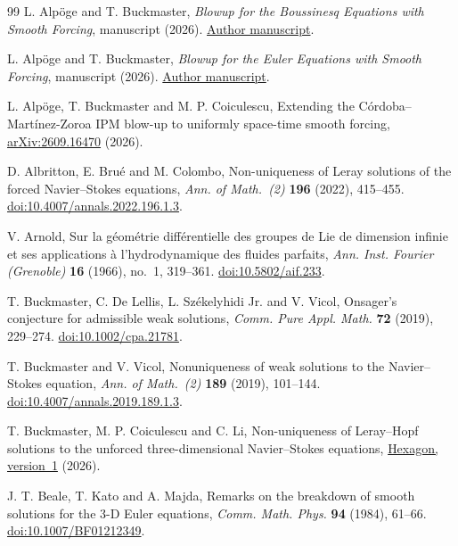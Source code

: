 \begin{thebibliography}{99}
 L. Alp\"oge and T. Buckmaster,
\emph{Blowup for the Boussinesq Equations with Smooth Forcing}, manuscript (2026).
\href{https://cims.nyu.edu/~tristanb/boussinesq.pdf}{Author manuscript}.

 L. Alp\"oge and T. Buckmaster,
\emph{Blowup for the Euler Equations with Smooth Forcing}, manuscript (2026).
\href{https://cims.nyu.edu/~tristanb/euler.pdf}{Author manuscript}.

L. Alp\"oge, T. Buckmaster and M. P. Coiculescu,
Extending the C\'ordoba--Mart\'inez-Zoroa IPM blow-up to uniformly
space-time smooth forcing,
\href{https://arxiv.org/abs/2609.16470}{arXiv:2609.16470} (2026).

 D. Albritton, E. Bru\'e and M. Colombo,
Non-uniqueness of Leray solutions of the forced Navier--Stokes equations,
\emph{Ann. of Math.~(2)} \textbf{196} (2022), 415--455.
\href{https://doi.org/10.4007/annals.2022.196.1.3}{doi:10.4007/annals.2022.196.1.3}.

 V. Arnold,
Sur la g\'eom\'etrie diff\'erentielle des groupes de Lie de dimension
infinie et ses applications \`a l'hydrodynamique des fluides parfaits,
\emph{Ann. Inst. Fourier (Grenoble)} \textbf{16} (1966), no.~1, 319--361.
\href{https://doi.org/10.5802/aif.233}{doi:10.5802/aif.233}.

T. Buckmaster, C. De Lellis, L. Sz\'ekelyhidi Jr. and V. Vicol,
Onsager's conjecture for admissible weak solutions,
\emph{Comm. Pure Appl. Math.} \textbf{72} (2019), 229--274.
\href{https://doi.org/10.1002/cpa.21781}{doi:10.1002/cpa.21781}.

 T. Buckmaster and V. Vicol,
Nonuniqueness of weak solutions to the Navier--Stokes equation,
\emph{Ann. of Math.~(2)} \textbf{189} (2019), 101--144.
\href{https://doi.org/10.4007/annals.2019.189.1.3}{doi:10.4007/annals.2019.189.1.3}.

T. Buckmaster, M. P. Coiculescu and C. Li,
Non-uniqueness of Leray--Hopf solutions to the unforced three-dimensional
Navier--Stokes equations, \href{https://hexagonmath.org/2611.00143v1}{Hexagon, version~1} (2026).

 J. T. Beale, T. Kato and A. Majda, Remarks on the breakdown
of smooth solutions for the 3-D Euler equations,
\emph{Comm. Math. Phys.} \textbf{94} (1984), 61--66.
\href{https://doi.org/10.1007/BF01212349}{doi:10.1007/BF01212349}.


\end{thebibliography}
